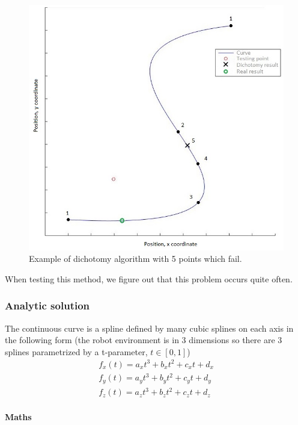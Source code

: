\begin{figure}[H]
\centering
\includegraphics[width=13cm]{img/dichotomy_bad.jpg}
\caption{Example of dichotomy algorithm with 5 points which fail.}
\label{dicho}
\end{figure}

When testing this method, we figure out that this problem occurs quite often.

\newpage
\subsubsection{Analytic solution} \label{GPR_ANALYTIC_SUBSUB}

The continuous curve is a spline defined by many cubic splines on each axis in the following form (the robot environment is in 3 dimensions so there are 3 splines parametrized by a t-parameter, $t\in[0,1]$)\\

\begin{equation}
  \begin{split}
    f_x(t) = a_x t^3+b_x t^2+c_x t+d_x\\
    f_y(t) = a_y t^3+b_y t^2+c_y t+d_y\\
    f_z(t) = a_z t^3+b_z t^2+c_z t+d_z
  \end{split}
\end{equation}

\paragraph*{Maths}

